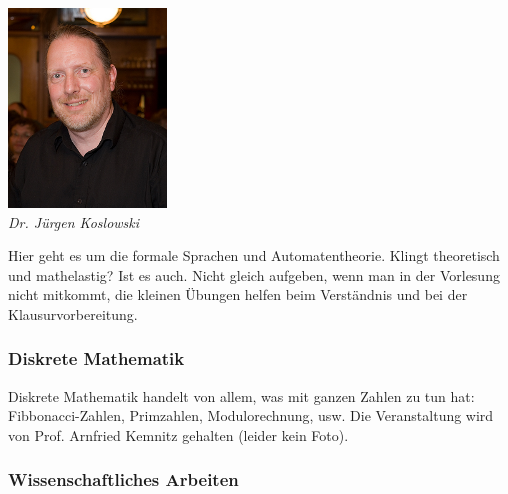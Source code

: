 \includegraphics[width=0.6\linewidth]{bilder/dozenten/koslowski.png}\\
\textit{Dr. Jürgen Koslowski}

Hier geht es um die formale Sprachen und Automatentheorie. Klingt
theoretisch und mathelastig? Ist es auch. Nicht gleich aufgeben, wenn
man in der Vorlesung nicht mitkommt, die kleinen Übungen helfen beim
Verständnis und bei der Klausurvorbereitung.

\subsubsection{Diskrete Mathematik}

Diskrete Mathematik handelt von allem, was mit ganzen Zahlen zu tun
hat: Fibbonacci-Zahlen, Primzahlen, Modulorechnung, usw.
Die Veranstaltung wird von Prof. Arnfried Kemnitz gehalten (leider kein Foto).


\subsubsection{Wissenschaftliches Arbeiten}

